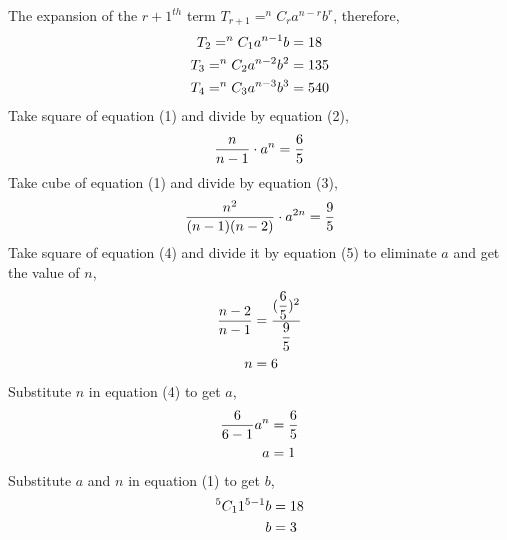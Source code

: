 \begin{solution}[\fullpage]
  The expansion of the $r+1^{th}$ term $T_{r+1} = ^nC_r a^{n-r}b^r$, 
  therefore,
  \begin{align}
    T_2 = ^nC_1 a^{n-1} b   &= 18 \\
    T_3 = ^nC_2 a^{n-2} b^2 &= 135 \\
    T_4 = ^nC_3 a^{n-3} b^3 &= 540
  \end{align}
  Take square of equation (1) and divide by equation (2),
  \begin{align}
    \dfrac{n}{n-1}\cdot a^n = \dfrac{6}{5}
  \end{align}
  Take cube of equation (1) and divide by equation (3),
  \begin{align}
    \dfrac{n^2}{(n-1)(n-2)}\cdot a^{2n} = \dfrac{9}{5}
  \end{align}
  Take square of equation (4) and divide it by equation (5)
  to eliminate $a$ and get the value of $n$,
  \begin{align}
    \dfrac{n-2}{n-1} &= \dfrac{({\dfrac{6}{5}})^2}{\dfrac{9}{5}} \\
                   n &= 6
  \end{align}
  Substitute $n$ in equation (4) to get $a$,
  \begin{align}
    \dfrac{6}{6 -1} a^n &= \dfrac{6}{5} \\
                              a   &= 1 
  \end{align}
  Substitute $a$ and $n$ in equation (1) to get $b$,
  \begin{align}
      ^5C_1 1^{5-1} b &= 18 \\
                         b &= 3
  \end{align}
\end{solution}

